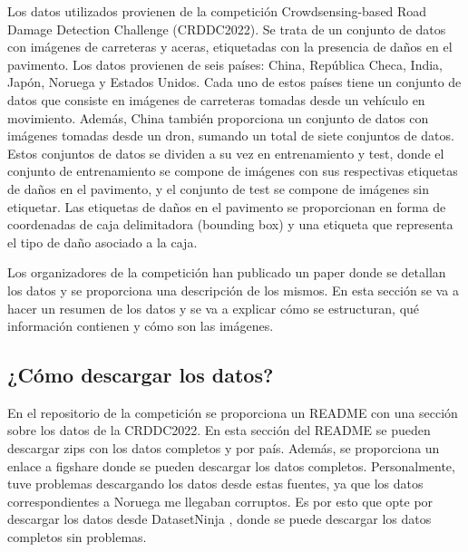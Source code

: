 Los datos utilizados provienen de la competición Crowdsensing-based Road Damage Detection Challenge (CRDDC2022). Se trata de un conjunto de datos con imágenes de carreteras y aceras, etiquetadas con la presencia de daños en el pavimento. Los datos provienen de seis países: China, República Checa, India, Japón, Noruega y Estados Unidos. Cada uno de estos países tiene un conjunto de datos que consiste en imágenes de carreteras tomadas desde un vehículo en movimiento. Además, China también proporciona un conjunto de datos con imágenes tomadas desde un dron, sumando un total de siete conjuntos de datos. Estos conjuntos de datos se dividen a su vez en entrenamiento y test, donde el conjunto de entrenamiento se compone de imágenes con sus respectivas etiquetas de daños en el pavimento, y el conjunto de test se compone de imágenes sin etiquetar. Las etiquetas de daños en el pavimento se proporcionan en forma de coordenadas de caja delimitadora (bounding box) y una etiqueta que representa el tipo de daño asociado a la caja. 

Los organizadores de la competición han publicado un paper \cite{RDD2022_data_paper} donde se detallan los datos y se proporciona una descripción de los mismos. En esta sección se va a hacer un resumen de los datos y se va a explicar cómo se estructuran, qué información contienen y cómo son las imágenes.


\subsection{¿Cómo descargar los datos?}
En el repositorio de la competición \cite{RoadDamageDetector_repo} se proporciona un README con una sección sobre los datos de la CRDDC2022. En esta sección del README se pueden descargar zips con los datos completos y por país. Además, se proporciona un enlace a figshare \cite{RDD2022_dataset} donde se pueden descargar los datos completos. Personalmente, tuve problemas descargando los datos desde estas fuentes, ya que los datos correspondientes a Noruega me llegaban corruptos. Es por esto que opte por descargar los datos desde DatasetNinja \cite{RDD2022_datasetNinja}, donde se puede descargar los datos completos sin problemas.


